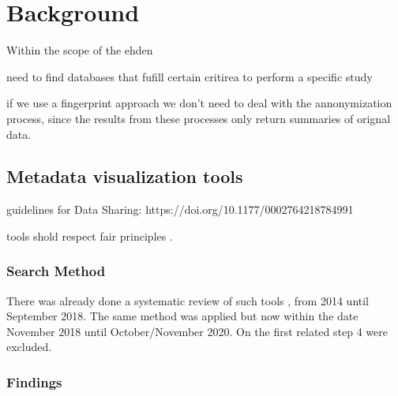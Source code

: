 \chapter{Background}
\label{chapter:background}

Within the scope of the \gls{ehden}

need to find databases that fufill certain critirea to perform a specific study

if we use a fingerprint approach we don't need to deal with the annonymization process,
since the results from these processes only return summaries of orignal data.

\section{Metadata visualization tools}
guidelines for Data Sharing: https://doi.org/10.1177/0002764218784991

tools shold respect fair principles \cite{fair}.

\subsection{Search Method}

There was already done a systematic review of such tools \cite{systematic_review}, from 2014 until September 2018.
The same method was applied but now within the date November 2018 until October/November 2020.
On the first related step 4 were excluded.

\subsection{Findings}


